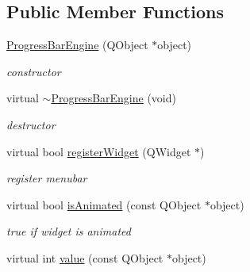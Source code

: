 \subsection*{Public Member Functions}
\begin{DoxyCompactItemize}
\item 
\mbox{\label{class_progress_bar_engine_a564a02e7c1a366029b2d7d374eb1b8dc}} 
\hyperlink{class_progress_bar_engine_a564a02e7c1a366029b2d7d374eb1b8dc}{Progress\+Bar\+Engine} (Q\+Object $\ast$object)
\begin{DoxyCompactList}\small\item\em constructor \end{DoxyCompactList}\item 
\mbox{\label{class_progress_bar_engine_a788303bcdc7e134f5b9b16b85203534f}} 
virtual \hyperlink{class_progress_bar_engine_a788303bcdc7e134f5b9b16b85203534f}{$\sim$\+Progress\+Bar\+Engine} (void)
\begin{DoxyCompactList}\small\item\em destructor \end{DoxyCompactList}\item 
\mbox{\label{class_progress_bar_engine_a754fab79685603178f47c9fa5623717b}} 
virtual bool \hyperlink{class_progress_bar_engine_a754fab79685603178f47c9fa5623717b}{register\+Widget} (Q\+Widget $\ast$)
\begin{DoxyCompactList}\small\item\em register menubar \end{DoxyCompactList}\item 
\mbox{\label{class_progress_bar_engine_a5de4ae4e7c31242c408bd7d925393bd8}} 
virtual bool \hyperlink{class_progress_bar_engine_a5de4ae4e7c31242c408bd7d925393bd8}{is\+Animated} (const Q\+Object $\ast$object)
\begin{DoxyCompactList}\small\item\em true if widget is animated \end{DoxyCompactList}\item 
\mbox{\label{class_progress_bar_engine_aa36692894c1728c6aa6e06d93803e5df}} 
virtual int \hyperlink{class_progress_bar_engine_aa36692894c1728c6aa6e06d93803e5df}{value} (const Q\+Object $\ast$object)

\end{DoxyCompactItemize}
